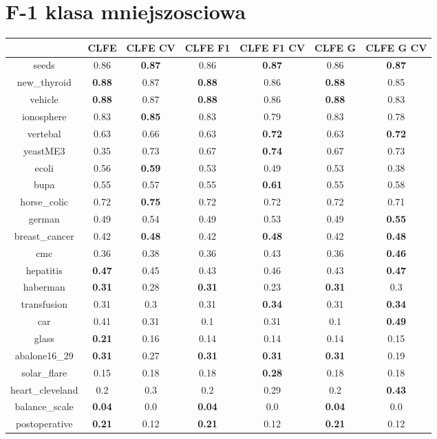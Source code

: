 \documentclass{article}%
\begin{document}
%
\section*{F{-}1 klasa mniejszosciowa}%
\begin{tabular}{c|cccccc}%
\hline%
&CLFE&CLFE CV&CLFE F1&CLFE F1 CV&CLFE G&CLFE G CV\\%
\hline%
seeds&0.86&\textbf{0.87}&0.86&\textbf{0.87}&0.86&\textbf{0.87}\\%
new\_thyroid&\textbf{0.88}&0.87&\textbf{0.88}&0.86&\textbf{0.88}&0.85\\%
vehicle&\textbf{0.88}&0.87&\textbf{0.88}&0.86&\textbf{0.88}&0.83\\%
ionosphere&0.83&\textbf{0.85}&0.83&0.79&0.83&0.78\\%
vertebal&0.63&0.66&0.63&\textbf{0.72}&0.63&\textbf{0.72}\\%
yeastME3&0.35&0.73&0.67&\textbf{0.74}&0.67&0.73\\%
ecoli&0.56&\textbf{0.59}&0.53&0.49&0.53&0.38\\%
bupa&0.55&0.57&0.55&\textbf{0.61}&0.55&0.58\\%
horse\_colic&0.72&\textbf{0.75}&0.72&0.72&0.72&0.71\\%
german&0.49&0.54&0.49&0.53&0.49&\textbf{0.55}\\%
breast\_cancer&0.42&\textbf{0.48}&0.42&\textbf{0.48}&0.42&\textbf{0.48}\\%
cmc&0.36&0.38&0.36&0.43&0.36&\textbf{0.46}\\%
hepatitis&\textbf{0.47}&0.45&0.43&0.46&0.43&\textbf{0.47}\\%
haberman&\textbf{0.31}&0.28&\textbf{0.31}&0.23&\textbf{0.31}&0.3\\%
transfusion&0.31&0.3&0.31&\textbf{0.34}&0.31&\textbf{0.34}\\%
car&0.41&0.31&0.1&0.31&0.1&\textbf{0.49}\\%
glass&\textbf{0.21}&0.16&0.14&0.14&0.14&0.15\\%
abalone16\_29&\textbf{0.31}&0.27&\textbf{0.31}&\textbf{0.31}&\textbf{0.31}&0.19\\%
solar\_flare&0.15&0.18&0.18&\textbf{0.28}&0.18&0.18\\%
heart\_cleveland&0.2&0.3&0.2&0.29&0.2&\textbf{0.43}\\%
balance\_scale&\textbf{0.04}&0.0&\textbf{0.04}&0.0&\textbf{0.04}&0.0\\%
postoperative&\textbf{0.21}&0.12&\textbf{0.21}&0.12&\textbf{0.21}&0.12\\%
\end{tabular}

%
\end{document}
